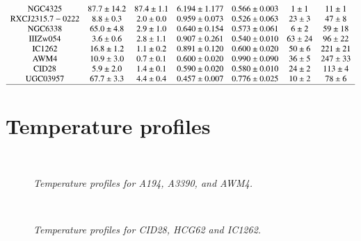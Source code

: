 \documentclass{aa} %
\begin{document}
\begin{appendix}
\begin{table}[t]
$$\begin{array}{ccccccc}
{\rm NGC4325 }	 	 & 87.7\pm14.2 & 87.4\pm1.1 & 6.194\pm1.177 & 0.566\pm0.003 & 1\pm1 & 11\pm1 \\ 
{\rm RXCJ2315.7-0222 } & 8.8\pm0.3 & 2.0\pm0.0 & 0.959\pm0.073 & 0.526\pm0.063 & 23\pm3 & 47\pm8 \\ 
{\rm NGC6338  }		 & 65.0\pm4.8 & 2.9\pm1.0 & 0.640\pm0.154 & 0.573\pm0.061 & 6\pm2 & 59\pm18 \\ 
{\rm IIIZw054	}	 & 3.6\pm0.6 & 2.8\pm1.1 & 0.907\pm0.261 & 0.540\pm0.010 & 63\pm24 & 96\pm22 \\ 
{\rm IC1262    }     & 16.8\pm1.2 & 1.1\pm0.2 & 0.891\pm0.120 & 0.600\pm0.020 & 50\pm6 & 221\pm21 \\ 
{\rm AWM4  	 }	 	 & 10.9\pm3.0 & 0.7\pm0.1 & 0.600\pm0.020 & 0.990\pm0.090 & 36\pm5 & 247\pm33 \\ 
{\rm CID28 	}		 & 5.9\pm2.0 & 1.4\pm0.1 & 0.590\pm0.020 & 0.580\pm0.010 & 24\pm2 & 113\pm4 \\ 
{\rm UGC03957 	}	 & 67.7\pm3.3 & 4.4\pm0.4 & 0.457\pm0.007 & 0.776\pm0.025 & 10\pm2 & 78\pm6 \\ 
\hline
\end{array}
\label{tab:SB}
$$
\end{table}


\clearpage
\section{Temperature profiles} \label{kTprofiles} 


\begin{figure*}[ht]
\begin{center}
\hbox{
}
\end{center}
\vspace{-20pt}
\caption{\footnotesize{\it Temperature profiles for A194, A3390, and AWM4.}}
\end{figure*}


\begin{figure*}[ht]
\begin{center}
\hbox{
}
\end{center}
\vspace{-20pt}
\caption{\footnotesize{\it Temperature profiles for CID28, HCG62 and IC1262.}}
\end{figure*}


\end{appendix}
\end{document}
